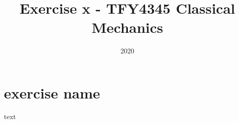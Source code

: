 \documentclass{article}
\title{Exercise x - TFY4345 Classical Mechanics}
\date{2020}
\begin{document}
    \maketitle

    \section{exercise name}
    text
\end{document}
